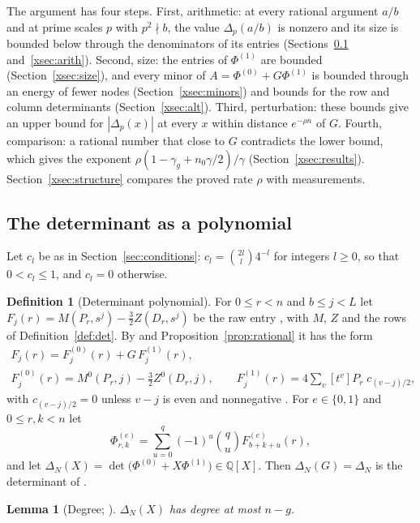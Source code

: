 \documentclass[11pt]{article}
\newtheorem{lemma}[theorem]{Lemma}
\theoremstyle{definition}
\newtheorem{definition}[theorem]{Definition}
\begin{document}
The argument has four steps. First, arithmetic: at every rational argument $a/b$ and at prime scales $p$ with $p^2\nmid b$, the value $\Delta_p(a/b)$ is nonzero and its size is bounded below through the denominators of its entries (Sections~\ref{xsec:poly} and~\ref{xsec:arith}). Second, size: the entries of $\Phi^{(1)}$ are bounded (Section~\ref{xsec:size}), and every minor of $A=\Phi^{(0)}+G\Phi^{(1)}$ is bounded through an energy of fewer nodes (Section~\ref{xsec:minors}) and bounds for the row and column determinants (Section~\ref{xsec:alt}). Third, perturbation: these bounds give an upper bound for $|\Delta_p(x)|$ at every $x$ within distance $e^{-\rho n}$ of $G$. Fourth, comparison: a rational number that close to $G$ contradicts the lower bound, which gives the exponent $\rho(1-\gamma_g+n_0\gamma/2)/\gamma$ (Section~\ref{xsec:results}). Section~\ref{xsec:structure} compares the proved rate $\rho$ with measurements.

\subsection{The determinant as a polynomial}\label{xsec:poly}

Let $c_l$ be as in Section~\ref{sec:conditions}: $c_l=\binom{2l}{l}4^{-l}$ for integers $l\ge0$, so that $0<c_l\le1$, and $c_l=0$ otherwise.

\begin{definition}[Determinant polynomial]\label{xdef:poly}
For $0\le r<n$ and $b\le j<L$ let $F_j(r)=M(P_r,s^j)-\frac32Z(D_r,s^j)$ be the raw entry \cite[Sec.~2]{OAI}, with $M$, $Z$ and the rows of Definition~\ref{def:det}. By \cite[Prop.~2.1]{OAI} and Proposition~\ref{prop:rational} it has the form
\begin{gather*}
F_j(r)=F^{(0)}_j(r)+G\,F^{(1)}_j(r),\\
F^{(0)}_j(r)=M^0(P_r,j)-\tfrac32Z^0(D_r,j),\qquad F^{(1)}_j(r)=4\sum_{v}[t^v]P_r\;c_{(v-j)/2},
\end{gather*}
with $c_{(v-j)/2}=0$ unless $v-j$ is even and nonnegative \cite[Sec.~4.3]{OAI}. For $e\in\{0,1\}$ and $0\le r,k<n$ let
\[
\Phi^{(e)}_{r,k}=\sum_{u=0}^{q}(-1)^u\binom qu F^{(e)}_{b+k+u}(r),
\]
and let $\Delta_N(X)=\det\big(\Phi^{(0)}+X\Phi^{(1)}\big)\in\mathbb Q[X]$. Then $\Delta_N(G)=\Delta_N$ is the determinant of \cite[Eq.~(7)]{OAI}.
\end{definition}

\begin{lemma}[Degree; {\cite[Lemma~3.1]{Litsey}}]\label{xlem:degree}
$\Delta_N(X)$ has degree at most $n-g$.
\end{lemma}
\end{document}
